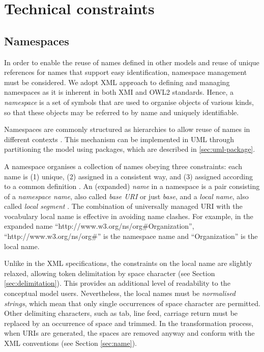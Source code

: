 \section{Technical constraints}
\label{sec:technical}
		
	\subsection{Namespaces}
	\label{sec:namespaces}
	
	In order to enable the reuse of names defined in other models and reuse of unique references for names that support easy identification, namespace management must be considered. We adopt XML approach to defining and managing namespaces as it is inherent in both XMI and OWL2 standards. Hence, a \textit{namespace} is a set of symbols that are used to organise objects of various kinds, so that these objects may be referred to by name and uniquely identifiable. 
	
	Namespaces are commonly structured as hierarchies to allow reuse of names in different contexts \cite{xml-namespaces}. This mechanism can be implemented in UML through partitioning the model using packages, which are described in \ref{sec:uml-package}.
	
	A namespace organises a collection of names obeying three constraints:
	each name is (1) unique, (2) assigned in a consistent way, and (3)
	assigned according to a common definition \cite{urn-rfc8141}. An (expanded) \textit{name} in a namespace is a pair consisting of a \textit{namespace name}, also called \textit{base URI} or just \textit{base}, and a \textit{local name}, also called \textit{local segment} \cite{xml1-spec,urn-rfc2141}. The combination of universally managed URI with the vocabulary local name is effective in avoiding name clashes. 	
	For example, in the expanded name ``http://www.w3.org/ns/org\#Organization'', ``http://www.w3.org/ns/org\#'' is the namespace name and ``Organization'' is the local name. 

	Unlike in the XML specifications, the constraints on the local name are slightly relaxed, allowing token delimitation by space character (see Section \ref{sec:delimitation}). This provides an additional level of readability to the conceptual model users. Nevertheless, the local names must be \textit{normalised strings}, which mean that only single occurrences of space character are permitted. Other delimiting characters, such as tab, line feed, carriage return must be replaced by an occurrence of space and trimmed. 
	In the transformation process, when URIs are generated, the spaces are removed anyway and conform with the XML conventions (see Section \ref{sec:name}).

